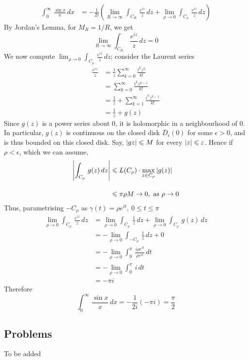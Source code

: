 \begin{example}
\begin{align*}
\int_0^\infty\,\frac{\sin x}{x}\,dx &= -\frac{1}{2i}\left(\lim_{R \to \infty}\int_{C_R}\, \frac{e^{iz}}{z}\,dz + \lim_{\rho \to 0}\int_{C_\rho}\, \frac{e^{iz}}{z}\,dz\right)
\end{align*}
By Jordan's Lemma, for $M_R = 1/R$, we get
\[\lim_{R \to \infty}\int_{C_R}\, \frac{e^{iz}}{z}\,dz = 0\]
We now compute $\displaystyle \lim_{\rho \to 0}\int_{C_\rho}\, \frac{e^{iz}}{z}\,dz$; consider the Laurent series
\begin{align*}
\frac{e^{iz}}{z} &= \frac{1}{z} \sum_{k=0}^\infty\frac{i^kz^k}{k!}\\[0.5em]
 &= \sum_{k=0}^\infty\frac{i^kz^{k-1}}{k!}\\[0.5em]
 &= \frac{1}{z} + \sum_{k=1}^\infty\frac{i^kz^{k-1}}{k!}\\[0.5em]
 &= \frac{1}{z} + g(z)
\end{align*}
Since $g(z)$ is a power series about $0$, it is holomorphic in a neighbourhood of $0$. In particular, $g(z)$ is continuous on the closed disk $\overline{D}_\epsilon(0)$ for some $\epsilon > 0$, and is thus bounded on this closed disk. Say, $\left\lvert g{z}\right\rvert \leqslant M$ for every $\left\lvert z\right\rvert \leqslant \varepsilon$. Hence if $\rho < \epsilon$, which we can assume, 
\begin{align*}
\left\lvert\int_{C_\rho}\, g(z)\,dz\right\rvert &\leqslant L(C_\rho)\cdot \max_{z \in C_\rho}\left\lvert g(z)\right\rvert\\[1em]
 &\leqslant \pi\rho M \to 0,\ \text{as }\rho \to 0
\end{align*} 
Thus, parametrising $-C_\rho$ as $\gamma(t) = \rho e^{it},\ 0 \leq t \leq \pi$
\begin{align*}
\lim_{\rho \to 0}\int_{C_\rho}\, \frac{e^{iz}}{z}\,dz &= \lim_{\rho \to 0}\int_{C_\rho}\, \frac{1}{z}\,dz + \lim_{\rho \to 0}\int_{C_\rho}\, g(z)\,dz\\[1em]
 &= -\lim_{\rho \to 0}\int_{-C_\rho}\, \frac{1}{z}\,dz + 0\\[1em]
 &= -\lim_{\rho \to 0}\int_0^\pi\, \frac{i\rho e^{it}}{\rho e^{it}}\,dt\\[1em]
 &= -\lim_{\rho \to 0}\int_0^\pi\, i\,dt\\[1em]
 &= -\pi i
\end{align*}
Therefore
\[\int_0^\infty\,\frac{\sin x}{x}\,dx = -\frac{1}{2i}(-\pi i) = \frac{\pi}{2}\]
\end{example}

\vspace*{2em}

\subsection{Problems}
\vspace{0.1in}
To be added
%
